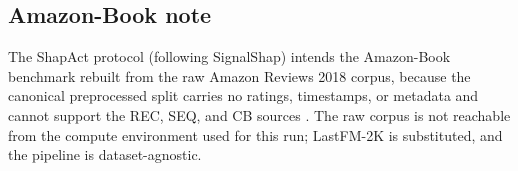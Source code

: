 \documentclass[pdflatex,sn-mathphys-num]{sn-jnl}
\theoremstyle{thmstyleone}%
\theoremstyle{thmstyletwo}%
\theoremstyle{thmstylethree}%
\begin{document}
\begin{appendices}
\section{Amazon-Book note}\label{secA4}

The ShapAct protocol (following SignalShap) intends the Amazon-Book benchmark rebuilt from the raw Amazon Reviews 2018 corpus, because the canonical preprocessed split carries no ratings, timestamps, or metadata and cannot support the REC, SEQ, and CB sources \cite{louhichi2026signalshap}. The raw corpus is not reachable from the compute environment used for this run; LastFM-2K is substituted, and the pipeline is dataset-agnostic.

\end{appendices}


\end{document}
